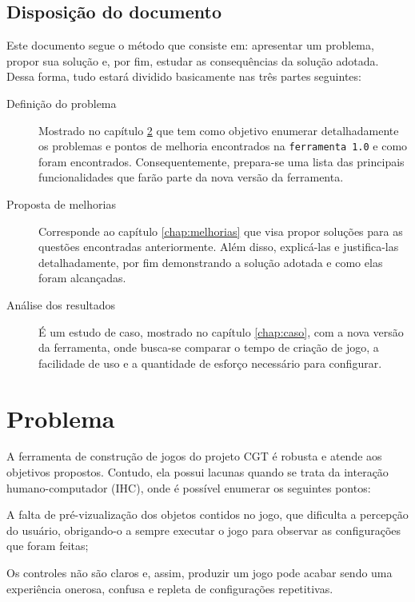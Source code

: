 \documentclass[12pt,twoside,openright,a4paper,english,brazil,sumario=tradicional]{abntex2}
\begin{document}
\section{Disposição do documento}
Este documento segue o método que consiste em: apresentar um problema, propor sua solução e, por fim, estudar as consequências da solução adotada. Dessa forma, tudo estará dividido basicamente nas três partes seguintes:
\begin{description}
	\item[Definição do problema] Mostrado no capítulo \ref{chap:problemas} que tem como objetivo enumerar detalhadamente os problemas e pontos de melhoria encontrados na \texttt{ferramenta 1.0} e como foram encontrados. Consequentemente, prepara-se uma lista das principais funcionalidades que farão parte da nova versão da ferramenta.
	\item[Proposta de melhorias] Corresponde ao capítulo \ref{chap:melhorias} que visa propor soluções para as questões encontradas anteriormente. Além disso, explicá-las e justifica-las detalhadamente, por fim demonstrando a solução adotada e como elas foram alcançadas.
	\item[Análise dos resultados] É um estudo de caso, mostrado no capítulo \ref{chap:caso}, com a nova versão da ferramenta, onde busca-se comparar o tempo de criação de jogo, a facilidade de uso e a quantidade de esforço necessário para configurar.
\end{description}

\chapter{Problema}
\label{chap:problemas}
A ferramenta de construção de jogos do projeto CGT é robusta e atende aos objetivos propostos. Contudo, ela possui lacunas quando se trata da interação humano-computador (IHC), onde é possível enumerar os seguintes pontos:

\begin{alineas}
	\item A falta de pré-vizualização dos objetos contidos no jogo, que dificulta a percepção do usuário, obrigando-o a sempre executar o jogo para observar as configurações que foram feitas;
	\item Os controles não são claros e, assim, produzir um jogo pode acabar sendo uma experiência onerosa, confusa e repleta de configurações repetitivas.
\end{alineas}
\end{document}
